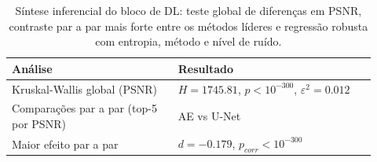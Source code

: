 \begin{table}[htbp]
\centering
\caption{Síntese inferencial do bloco de DL: teste global de diferenças em PSNR, contraste par a par mais forte entre os métodos líderes e regressão robusta com entropia, método e nível de ruído.}
\label{tab:inferential-summary-dl}
\footnotesize
\begin{tabular}{p{0.42\linewidth}p{0.50\linewidth}}
\toprule
Análise & Resultado \\
\midrule
Kruskal-Wallis global (PSNR) & $H=1745.81$, $p<10^{-300}$, $\varepsilon^2=0.012$ \\
Comparações par a par (top-5 por PSNR) & AE vs U-Net \\
Maior efeito par a par & $d=-0.179$, $p_{corr}<10^{-300}$ \\
\bottomrule
\end{tabular}
\end{table}
